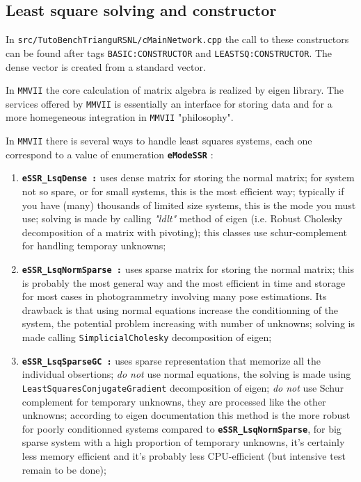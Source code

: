 \subsection{Least square solving and constructor}

In {\tt src/TutoBenchTrianguRSNL/cMainNetwork.cpp} the call to these constructors can be found
after tags {\tt  BASIC:CONSTRUCTOR} and {\tt LEASTSQ:CONSTRUCTOR}.
The dense vector is created from a standard vector.\UNCLEAR

In {\tt MMVII} the core calculation of matrix algebra is realized
by eigen library. The services offered by {\tt MMVII} is essentially
an interface for storing data and for a more homegeneous integration
in {\tt MMVII} "philosophy".

In {\tt MMVII} there is several ways to handle least squares systems, each
one correspond to a value of enumeration {\bf \tt eModeSSR} :

\begin{enumerate}

    \item{\bf \tt eSSR\_LsqDense :}
          uses dense matrix for storing the normal matrix; for system not so spare,
          or for small systems, this is the most efficient way; typically if you have
          (many) thousands of limited size systems, this is the mode you must use; solving
          is made by calling \emph{"ldlt"} method of eigen (i.e. Robust Cholesky 
          decomposition of a matrix with pivoting); this classes use schur-complement
          for handling temporay unknowns;

    \item {\bf \tt eSSR\_LsqNormSparse :}
          uses sparse matrix for storing the normal matrix; this is probably the most
          general way and the most efficient in time and storage for most cases in 
          photogrammetry involving many pose estimations. Its
          drawback is that using normal equations increase the conditionning of the
          system, the potential problem increasing with number of unknowns; 
          solving is made calling  {\tt SimplicialCholesky} decomposition of eigen;

    \item {\bf \tt eSSR\_LsqSparseGC :}
          uses sparse representation that memorize all the individual obsertions;
          \emph{do not} use normal equations, the solving is made using
          {\tt LeastSquaresConjugateGradient} decomposition of eigen;
          \emph{do not} use Schur complement for temporary unknowns, they
          are processed like the other unknowns; according to eigen documentation
          this method is the more robust for poorly conditionned systems 
          compared to {\bf \tt eSSR\_LsqNormSparse}, for big
          sparse system with a high proportion of temporary unknowns, 
          it's certainly less memory  efficient and it's probably
          less CPU-efficient (but intensive test remain to be done);

\end{enumerate}

